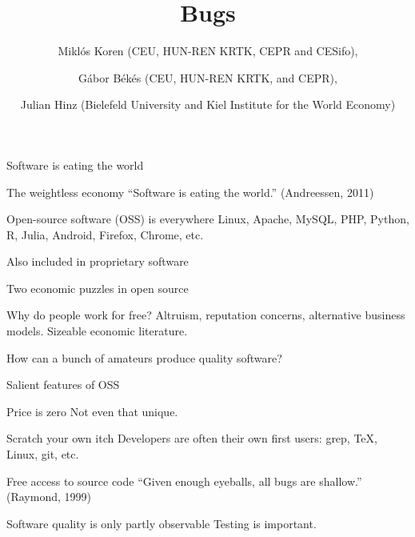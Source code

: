 \documentclass[
  ignorenonframetext,
  aspectratio=1610,
]{beamer}
\title{Bugs \emoji{lady-beetle}}
\author{Miklós Koren (CEU, HUN-REN KRTK, CEPR and CESifo), \and Gábor
Békés (CEU, HUN-REN KRTK, and CEPR), \and Julian Hinz (Bielefeld
University and Kiel Institute for the World Economy)}
\date{March 6, 2024\footnote<.->{This work was funded by the European
  Union under the Horizon Europe grant 101061123. Views and opinions
  expressed are, however, those of the author(s) only and do not
  necessarily reflect those of the European Union or the European
  Commission. Neither the European Union nor the granting authority can
  be held responsible for them.}}
\begin{document}
\frame{\titlepage}

\begin{frame}{Software is eating the world}
\label{software-is-eating-the-world}
\begin{block}{The weightless economy}
\label{the-weightless-economy}
``Software is eating the world.'' (Andreessen, 2011)
\end{block}

\begin{block}{Open-source software (OSS) is everywhere}
\label{open-source-software-oss-is-everywhere}
Linux, Apache, MySQL, PHP, Python, R, Julia, Android, Firefox, Chrome,
etc.

Also included in proprietary software
\end{block}
\end{frame}

\begin{frame}{Two economic puzzles in open source}
\label{two-economic-puzzles-in-open-source}
\begin{block}{Why do people work for free?}
\label{why-do-people-work-for-free}
Altruism, reputation concerns, alternative business models. Sizeable
economic literature.

\pause
\end{block}

\begin{block}{How can a bunch of amateurs produce quality software?}
\label{how-can-a-bunch-of-amateurs-produce-quality-software}
\end{block}
\end{frame}

\begin{frame}{Salient features of OSS}
\label{salient-features-of-oss}
\begin{block}{Price is zero}
\label{price-is-zero}
Not even that unique.

\pause
\end{block}

\begin{block}{Scratch your own itch}
\label{scratch-your-own-itch}
Developers are often their own first users: grep, TeX, Linux, git, etc.
\end{block}

\begin{block}{Free access to source code}
\label{free-access-to-source-code}
``Given enough eyeballs, all bugs are shallow.'' (Raymond, 1999)
\end{block}

\begin{block}{Software quality is only partly observable}
\label{software-quality-is-only-partly-observable}
Testing is important.
\end{block}
\end{frame}
\end{document}
